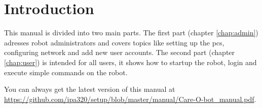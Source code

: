 \chapter{Introduction}
\label{chap:introduction} 

This manual is divided into two main parts. The first part (chapter \ref{chap:admin}) adresses robot administrators and covers topics like setting up the pcs, configuring network and add new user accounts. The second part (chapter \ref{chap:user}) is intended for all users, it shows how to startup the robot, login and execute simple commands on the robot.

You can always get the latest version of this manual at \url{https://github.com/ipa320/setup/blob/master/manual/Care-O-bot_manual.pdf}.


